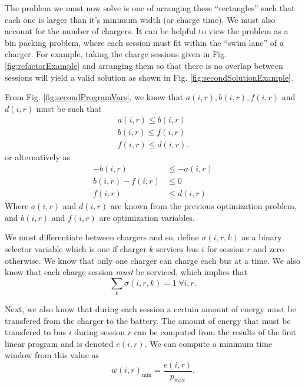 \par The problem we must now solve is one of arranging these ``rectangles'' such that each one is larger than it's minimum width (or charge time).  We must also account for the number of chargers. It can be helpful to view the problem as a bin packing problem, where each session must fit within the ``swim lane'' of a charger.  For example, taking the charge sessions given in Fig. \ref{fig:refactorExample} and arranging them so that there is no overlap between sessions will yield a valid solution as shown in Fig. \ref{fig:secondSolutionExample}.
\par From Fig. \ref{fig:secondProgramVars}, we know that $a(i,r), b(i,r),f(i,r)$ and $d(i,r)$ must be such that 
\begin{equation*}\begin{aligned}
	a(i,r) \le b(i,r) \\
	b(i,r) \le f(i,r) \\
	f(i,r) \le d(i,r). 	
\end{aligned}\end{equation*}
or alternatively as
\begin{equation} \begin{aligned}
	-b(i,r) &\le -a(i,r) \\
	b(i,r) - f(i,r) &\le 0 \\
	f(i,r) &\le d(i,r)
\end{aligned} \end{equation}
Where $a(i,r)$ and $d(i,r)$ are known from the previous optimization problem, and $b(i,r)$ and $f(i,r)$ are optimization variables. 
\par We must differentiate between chargers and so, define $\sigma(i,r,k)$ as a binary selector variable which is one if charger $k$ services bus $i$ for session $r$ and zero otherwise. We know that only one charger can charge each bus at a time. We also know that each charge session {\it must} be serviced, which implies that
\begin{equation}
	\sum_k \sigma(i,r,k) = 1  \ \forall i,r.
\end{equation}
\par Next, we also know that during each session a certain amount of energy must be transfered from the charger to the battery.  The amount of energy that must be transfered to bus $i$ during session $r$ can be computed from the results of the first linear program and is denoted $e(i,r)$. We can compute a minimum time window from this value as 
\begin{equation*}
	w(i,r)_{\text{min}} = \frac{e(i,r)}{p_\text{max}}.
\end{equation*}
